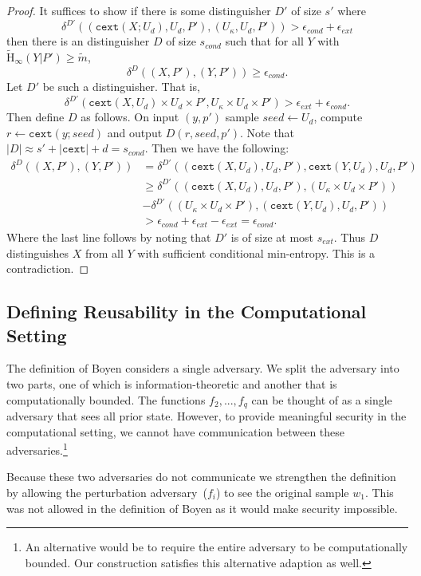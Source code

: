 \documentclass[11pt]{article}
\newcommand{\Hav}{\tilde{\mathrm{H}}_\infty}
\newcommand{\cext}{\ensuremath{\mathtt{cext}}}
\begin{document}
\begin{proof}
It suffices to show if there is some distinguisher $D'$ of size $s'$ where
\[\delta^{D'}((\cext(X; U_d), U_d, P'), (U_\kappa, U_d, P'))>\epsilon_{cond}+ \epsilon_{ext}\]
 then there is an distinguisher $D$ of size $s_{cond}$ such that for all $Y$ with $\Hav(Y|P') \geq \tilde{m}$,
 \[
 \delta^{D}((X,P'), (Y, P'))\geq \epsilon_{cond}.
 \]
Let $D'$ be such a distinguisher.  That is,
\[
\delta^{D'}(\cext(X, U_d)\times U_d \times P', U_\kappa\times U_d\times P')> \epsilon_{ext}+\epsilon_{cond}.
\]
Then define $D$ as follows.  On input $(y, p')$ sample $seed\leftarrow U_d$, compute $r\leftarrow \cext(y; seed)$ and output $D(r, seed, p')$.  Note that $|D| \approx s' + |\cext| +d= s_{cond}$.  Then we have the following:
\begin{align*}
\delta^{D}((X, P'), (Y, P'))&= \delta^{D'}((\cext(X, U_d), U_d, P'), \cext(Y, U_d), U_d, P')\\
&\geq \delta^{D'}((\cext(X, U_d), U_d, P'), (U_\kappa\times U_d \times P')) \\
&- \delta^{D'}((U_\kappa\times U_d \times P'), (\cext(Y, U_d), U_d, P'))\\
&>\epsilon_{cond}+\epsilon_{ext}- \epsilon_{ext} = \epsilon_{cond}.
\end{align*}
Where the last line follows by noting that $D'$ is of size at most $s_{ext}$.  Thus $D$ distinguishes $X$ from all $Y$ with sufficient conditional min-entropy.  This is a contradiction.
\end{proof}

\subsection{Defining Reusability in the Computational Setting}
\label{sec:comparing reusability}

The definition of Boyen considers a single adversary.  We split the adversary into two parts, one of which is information-theoretic and another that is computationally bounded.  The functions $f_2,..., f_q$ can be thought of as a single adversary that sees all prior state.  However, to provide meaningful security in the computational setting, we cannot have communication between these adversaries.\footnote{An alternative would be to require the entire adversary to be computationally bounded.  Our construction satisfies this alternative adaption as well.}  

Because these two adversaries do not communicate we strengthen the definition by allowing the perturbation adversary~($f_i$) to see the original sample $w_1$.  This was not allowed in the definition of Boyen as it would make security impossible.  
\end{document}
